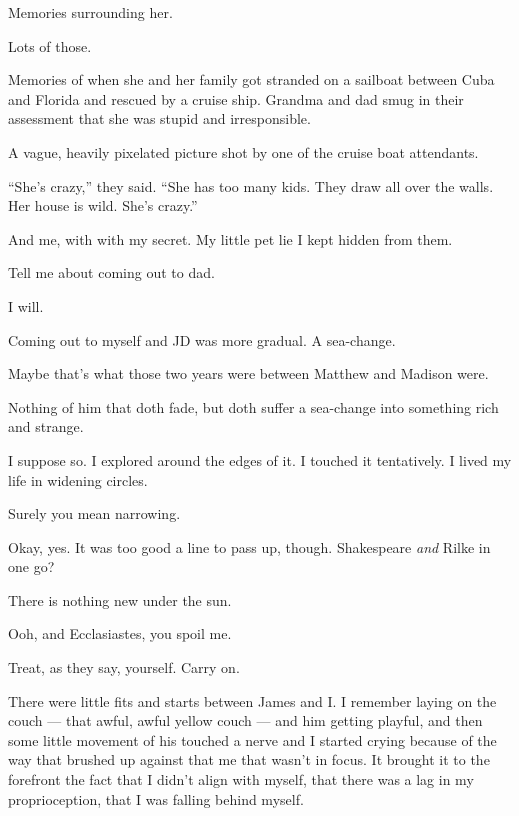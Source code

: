 \begin{ally}
Memories surrounding her.
\end{ally}
Lots of those.

\begin{ally}
Memories of when she and her family got stranded on a sailboat between Cuba and Florida and rescued by a cruise ship. Grandma and dad smug in their assessment that she was stupid and irresponsible.
\end{ally}
A vague, heavily pixelated picture shot by one of the cruise boat attendants.

\begin{ally}
``She's crazy,'' they said. ``She has too many kids. They draw all over the walls. Her house is wild. She's crazy.''
\end{ally}
And me, with with my secret. My little pet lie I kept hidden from them.

\begin{ally}
Tell me about coming out to dad.
\end{ally}
I will.
\newpage

Coming out to myself and JD was more gradual. A sea-change.

\begin{ally}
Maybe that's what those two years were between Matthew and Madison were.
\end{ally}
Nothing of him that doth fade, but doth suffer a sea-change into something rich and strange.

I suppose so. I explored around the edges of it. I touched it tentatively. I lived my life in widening circles.

\begin{ally}
Surely you mean narrowing.
\end{ally}
Okay, yes. It was too good a line to pass up, though. Shakespeare \emph{and} Rilke in one go?

\begin{ally}
There is nothing new under the sun.
\end{ally}
Ooh, and Ecclasiastes, you spoil me.

\begin{ally}
Treat, as they say, yourself. Carry on.
\end{ally}
There were little fits and starts between James and I. I remember laying on the couch --- that awful, awful yellow couch --- and him getting playful, and then some little movement of his touched a nerve and I started crying because of the way that brushed up against that me that wasn't in focus. It brought it to the forefront the fact that I didn't align with myself, that there was a lag in my proprioception, that I was falling behind myself.

